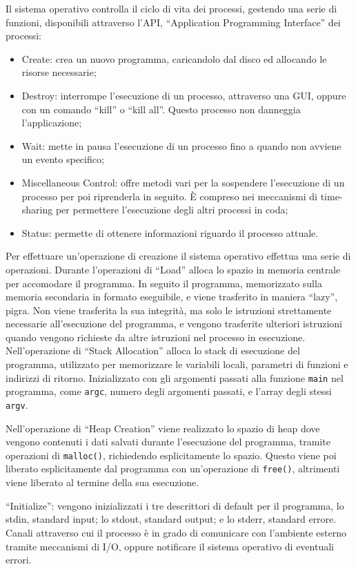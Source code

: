 \documentclass{article}
\numberwithin{equation}{subsection}
\begin{document}
Il sistema operativo controlla il ciclo di vita dei processi, gestendo una serie di funzioni, disponibili attraverso l'API, ``Application Programming Interface'' 
dei processi:
\begin{itemize}
	\item Create: crea un nuovo programma, caricandolo dal disco ed allocando le risorse necessarie;
	\item Destroy: interrompe l'esecuzione di un processo, attraverso una GUI, oppure con un comando ``kill'' o ``kill all''. Questo processo non danneggia l'applicazione;
	\item Wait: mette in pausa l'esecuzione di un processo fino a quando non avviene un evento specifico;
	\item Miscellaneous Control: offre metodi vari per la sospendere l'esecuzione di un processo per poi riprenderla in seguito. \`{E} compreso nei meccanismi di time-sharing per permettere l'esecuzione degli altri processi in coda;
	\item Status: permette di ottenere informazioni riguardo il processo attuale.  
\end{itemize}

Per effettuare un'operazione di creazione il sistema operativo effettua una serie di operazioni. Durante l'operazioni di ``Load'' alloca lo spazio in memoria centrale per accomodare il programma. In seguito il programma, memorizzato 
sulla memoria secondaria in formato eseguibile, e viene trasferito in maniera ``lazy'', pigra. Non viene trasferita la sua integrità, ma solo le istruzioni 
strettamente necessarie all'esecuzione del programma, e vengono trasferite ulteriori istruzioni quando vengono richieste da altre istruzioni nel processo in 
esecuzione. 
Nell'operazione di ``Stack Allocation'' alloca lo stack di esecuzione del programma, utilizzato per memorizzare le variabili locali, parametri di funzioni e indirizzi 
di ritorno. 
Inizializzato con gli argomenti passati alla funzione \verb|main| nel programma, come \verb|argc|, numero degli argomenti passati, e l'array degli stessi \verb|argv|. 

Nell'operazione di ``Heap Creation'' viene realizzato lo spazio di heap dove vengono contenuti i dati salvati durante l'esecuzione del programma, tramite operazioni 
di \verb|malloc()|, richiedendo esplicitamente lo spazio. Questo viene poi liberato esplicitamente dal programma con un'operazione di \verb|free()|, altrimenti viene 
liberato al termine della sua esecuzione. 

``Initialize'': vengono inizializzati i tre descrittori di default per il programma, lo stdin, standard input; lo stdout, standard output; e lo stderr, standard errore. 
Canali attraverso cui il processo è in grado di comunicare con l'ambiente esterno tramite meccanismi di I/O, oppure notificare il sistema operativo di eventuali errori. 
\end{document}
